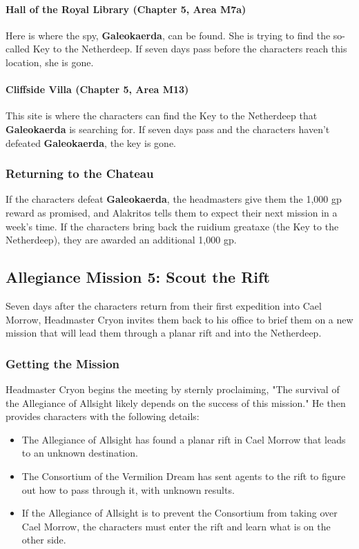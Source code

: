 \documentclass[10pt,a4,twoside,twocolumn,openany,nodeprecatedcode]{dndbook}
\begin{document}
\paragraph{Hall of the Royal Library (Chapter 5, Area M7a)}
Here is where the spy, \textbf{Galeokaerda}, can be found. She is trying to find the so-called Key to the Netherdeep. If seven days pass before the characters reach this location, she is gone.
\paragraph{Cliffside Villa (Chapter 5, Area M13)}
This site is where the characters can find the Key to the Netherdeep that \textbf{Galeokaerda} is searching for. If seven days pass and the characters haven't defeated \textbf{Galeokaerda}, the key is gone.
\subsubsection{Returning to the Chateau}
If the characters defeat \textbf{Galeokaerda}, the headmasters give them the 1,000 gp reward as promised, and Alakritos tells them to expect their next mission in a week's time. If the characters bring back the ruidium greataxe (the Key to the Netherdeep), they are awarded an additional 1,000 gp.
\subsection{Allegiance Mission 5: Scout the Rift}
Seven days after the characters return from their first expedition into Cael Morrow, Headmaster Cryon invites them back to his office to brief them on a new mission that will lead them through a planar rift and into the Netherdeep.
\subsubsection{Getting the Mission}
Headmaster Cryon begins the meeting by sternly proclaiming, "The survival of the Allegiance of Allsight likely depends on the success of this mission." He then provides characters with the following details:
\begin{itemize}

\item The Allegiance of Allsight has found a planar rift in Cael Morrow that leads to an unknown destination.
\item The Consortium of the Vermilion Dream has sent agents to the rift to figure out how to pass through it, with unknown results.
\item If the Allegiance of Allsight is to prevent the Consortium from taking over Cael Morrow, the characters must enter the rift and learn what is on the other side.
\end{itemize}
\end{document}
